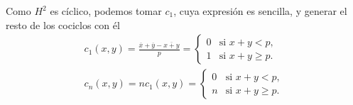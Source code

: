 	Como $H^2$ es cíclico, podemos tomar $c_1$, cuya expresión es sencilla, y generar el resto de los cociclos con él
	\begin{gather*}
	    c_1(x,y) = \frac{\overline{x} + \overline{y} - \overline{x+y}}{p} =  \begin{cases}
	        0 & \text{si } x+y < p,\\
	        1 & \text{si } x+y \geq p.
	        \end{cases} \\
	    c_n(x,y) = nc_1(x,y) =  \begin{cases}
	        0 & \text{si } x+y < p,\\
	        n & \text{si } x+y \geq p.
	        \end{cases}
	\end{gather*}
